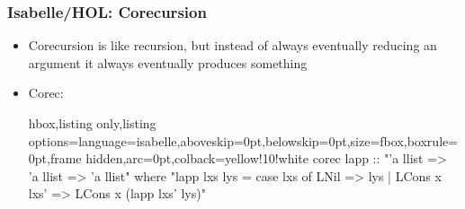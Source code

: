 \documentclass[aspectratio=169,10pt]{beamer}
\begin{document}
\begin{frame}[fragile]
  \frametitle{Isabelle/HOL: Corecursion}
  \begin{itemize}
    \item Corecursion is like recursion, but instead of always eventually reducing an argument it always eventually produces something
          \pause
    \item Corec:
          \vspace*{-1ex}
          \begin{tcblisting}{hbox,listing only,listing options={language=isabelle,aboveskip=0pt,belowskip=0pt},size=fbox,boxrule=0pt,frame hidden,arc=0pt,colback=yellow!10!white}
corec lapp :: "'a llist => 'a llist => 'a llist" where
"lapp lxs lys = case lxs of LNil => lys | LCons x lxs' => LCons x (lapp lxs' lys)"
          \end{tcblisting}
          \vspace*{-1ex}
  \end{itemize}
\end{frame}
\end{document}
